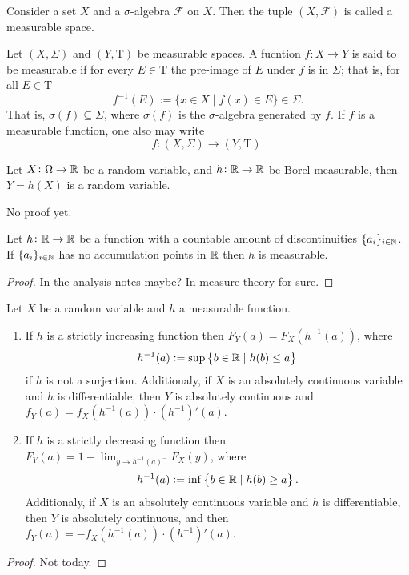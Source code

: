 \documentclass[11pt,a4paper]{article}
\begin{document}
  \begin{definition}
    Consider a set $X$ and a $\sigma$-algebra $\mathcal F$ on $X$.
    Then the tuple $(X,{\mathcal {F}})$ is called a measurable space.
  \end{definition}
  \begin{definition}
    Let $(X, \Sigma)$ and $(Y, \mathrm{T})$ be measurable spaces. A fucntion
    $f \colon X \to Y$ is said to be measurable if for every $E \in \mathrm{T}$
    the pre-image of $E$ under $f$ is in $\Sigma$; that is, for all 
    $E \in \mathrm{T}$
    \[
      f^{-1}(E):=\{x\in X\mid f(x)\in E\}\in \Sigma .
    \]
    That is, $\sigma(f) \subseteq \Sigma$, where $\sigma(f)$ is the
    $\sigma$-algebra generated by $f$. If $f$ is a measurable function,
    one also may write
    \[
      f \colon (X, \Sigma) \rightarrow (Y, \mathrm{T}).
    \]
  \end{definition}
  
  \begin{proposition}
    Let $X \colon \Omega \to \mathbb{R}$ be a random variable, and $h \colon \mathbb{R} \to \mathbb{R}$
    be Borel measurable, then $Y = h(X)$ is a random variable.
  \end{proposition}
  No proof yet.

  \begin{theorem}
    Let $h \colon \mathbb{R} \to \mathbb{R}$ be a function with a countable amount of 
    discontinuities $\{a_i\}_{i \in \mathbb{N}}$. If $\{a_i\}_{i \in \mathbb{N}}$ has no
    accumulation points in $\mathbb{R}$ then $h$ is measurable.
  \end{theorem}
  \begin{proof}
    In the analysis notes maybe? In measure theory for sure.
  \end{proof}

  \begin{proposition}[Distribution of $Y = h(X)$]
    Let $X$ be a random variable and $h$ a measurable function.
    \begin{enumerate}
      \item
      If $h$ is a strictly increasing function then $F_Y(a) = F_X(h^{-1}(a))$,
      where 
      \[ h^{-1}(a) := \sup\set{b \in \mathbb{R}\mid h(b) \le a} \] 
      if $h$ is not
      a surjection. Additionaly, if $X$ is an absolutely continuous variable
      and $h$ is differentiable, 
      then $Y$ is absolutely continuous and 
      $f_Y(a) = f_X(h^{-1}(a)) \cdot (h^{-1})'(a)$.
      \item
      If $h$ is a strictly decreasing function then 
      $F_Y(a) = 1 - \lim_{y \to h^{-1}(a)^-} F_X(y)$,
      where
      \[ h^{-1}(a) := \inf\set{b \in \mathbb{R}\mid h(b) \geq a}. \]
      Additionaly, if $X$ is an absolutely continuous variable
      and $h$ is differentiable, then $Y$ is absolutely continuous,
      and then $f_Y(a) = -f_X(h^{-1}(a)) \cdot (h^{-1})'(a)$. 
    \end{enumerate}
  \end{proposition}
  \begin{proof}
    Not today.
  \end{proof}
\end{document}
